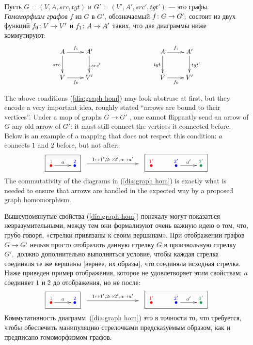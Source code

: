 \documentclass[../main/CT4S-EN-RU]{subfiles}
\begin{document}
\begin{definitionRUS}\label{def:graph homomorphism}
Пусть $G=(V,A,src,tgt)$ и $G'=(V',A',src',tgt')$ — это графы. {\em Гомоморфизм графов} $f$ из $G$ в $G'$, обозначаемый $f\colon G\rightarrow G',$ состоит из двух функций $f_0\colon V\rightarrow V'$ и $f_1\colon A\rightarrow A'$ таких, что две диаграммы ниже коммутируют:
\begin{align}\label{dia:graph hom}
\xymatrix{
    A \ar[r]^{f_1} \ar[d]_{src}  &  A' \ar[d]^{src'}  \\
    V \ar[r]_{f_0}  &  V'
}
\hspace{1in}
\xymatrix{
    A \ar[r]^{f_1} \ar[d]_{tgt}  &  A' \ar[d]^{tgt'}  \\
    V \ar[r]_{f_0}  &  V'
}
\end{align}
\end{definitionRUS}

\begin{remarkENG}
The above conditions (\ref{dia:graph hom}) may look abstruse at first, but they encode a very important idea, roughly stated “arrows are bound to their vertices”. Under a map of graphs $G\to G'$ , one cannot flippantly send an arrow of $G$ any old arrow of $G'$: it must still connect the vertices it connected before. Below is an example of a mapping that does not respect this condition: $a$ connects $1$ and $2$ before, but not after:
$$
\fbox{\xymatrix{\LMO{\color{red}{1}}\ar[r]^{a}&\LMO{\color{blue}{2}}}}
\xymatrix{~\ar[rr]^{1\mapsto 1',2\mapsto 2', a\mapsto a'}&\hsp&~}
\fbox{\xymatrix{\LMO{\color{red}{1'}}&\LMO{\color{blue}{2'}}\ar[r]^{a'}&\LMO{\color{ForestGreen}{3'}}}}
$$
The commutativity of the diagrams in (\ref{dia:graph hom}) is exactly what is needed to ensure that arrows are handled in the expected way by a proposed graph homomorphism.
\end{remarkENG}

\begin{remarkRUS}
Вышеупомянутые свойства (\ref{dia:graph hom}) поначалу могут показаться невразумительными, между тем они формализуют очень важную идею о том, что, грубо говоря, «стрелки привязаны к своим вершинам». При отображении графов $G\to G'$ нельзя просто отобразить данную стрелку $G$ в произвольную стрелку $G',$ должно дополнительно выполняться условие, чтобы каждая стрелка соединяля те же вершины [вернее, их образы], что соединяла исходная стрелка. Ниже приведен пример отображения, которое не удовлетворяет этим свойствам: $a$ соединяет $1$ и $2$ до отображения, но не после:
$$
\fbox{\xymatrix{
    \LMO{\color{red}{1}} \ar[r]^{a}  &  \LMO{\color{blue}{2}}
}}
\xymatrix{
    ~ \ar[rr]^{1\mapsto 1', 2\mapsto 2', a\mapsto a'}  &  \hsp  &  ~
}
\fbox{\xymatrix{
    \LMO{\color{red}{1'}}  &  \LMO{\color{blue}{2'}} \ar[r]^{a'}  &  \LMO{\color{ForestGreen}{3'}}
}}
$$
Коммутативность диаграмм~(\ref{dia:graph hom}) это в точности то, что требуется, чтобы обеспечить манипуляцию стрелочками предсказуемым образом, как и предписано гомоморфизмом графов.
\end{remarkRUS}
\end{document}
